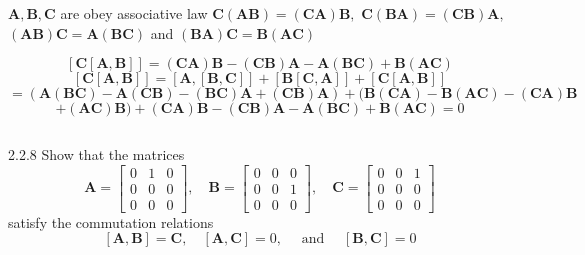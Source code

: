 $\mathbf{A}, \mathbf{B}, \mathbf{C}$ are obey associative law $ \mathbf{C}(\mathbf{A} \mathbf{B})=(\mathbf{C} \mathbf{A}) \mathbf{B},$ $\mathbf{C}(\mathbf{B} \mathbf{A})=(\mathbf{C} \mathbf{B}) \mathbf{A},$ $(\mathbf{A} \mathbf{B}) \mathbf{C}=\mathbf{A}(\mathbf{B} \mathbf{C})$ and $(\mathbf{B} \mathbf{A}) \mathbf{C}=\mathbf{B}(\mathbf{A} \mathbf{C})$


$$[\mathbf{C}[\mathbf{A}, \mathbf{B}]]=(\mathbf{C} \mathbf{A}) \mathbf{B}-(\mathbf{C} \mathbf{B}) \mathbf{A}-\mathbf{A}(\mathbf{B} \mathbf{C})+\mathbf{B}(\mathbf{A} \mathbf{C})$$
$$[\mathbf{C}[\mathbf{A}, \mathbf{B}]]=[\mathbf{A},[\mathbf{B}, \mathbf{C}]]+[\mathbf{B}[\mathbf{C}, \mathbf{A}]]+[\mathbf{C}[\mathbf{A}, \mathbf{B}]] $$
$$=(\mathbf{A}(\mathbf{B} \mathbf{C})-\mathbf{A}(\mathbf{C} \mathbf{B})-(\mathbf{B} \mathbf{C}) \mathbf{A}+(\mathbf{C} \mathbf{B}) \mathbf{A})+(\mathbf{B}(\mathbf{C} \mathbf{A})-\mathbf{B}(\mathbf{A} \mathbf{C})-(\mathbf{C} \mathbf{A}) \mathbf{B} $$
$$+(\mathbf{A} \mathbf{C}) \mathbf{B})+(\mathbf{C} \mathbf{A}) \mathbf{B}-(\mathbf{C} \mathbf{B}) \mathbf{A}-\mathbf{A}(\mathbf{B} \mathbf{C})+\mathbf{B}(\mathbf{A} \mathbf{C})=0$$

$$$$

\begin{mybox}{2.2.8}
Show that the matrices
$$\mathbf{A}=\begin{bmatrix}{0} & {1} & {0} \\ {0} & {0} & {0} \\ {0} & {0} & {0}\end{bmatrix}, \quad \mathbf{B}=\begin{bmatrix}{0} & {0} & {0} \\ {0} & {0} & {1} \\ {0} & {0} & {0}\end{bmatrix}, \quad \mathbf{C}=\begin{bmatrix}{0} & {0} & {1} \\ {0} & {0} & {0} \\ {0} & {0} & {0}\end{bmatrix}$$
satisfy the commutation relations
$$
[\mathbf{A}, \mathbf{B}]=\mathbf{C}, \quad[\mathbf{A}, \mathbf{C}]=0, \quad \text { and } \quad[\mathbf{B}, \mathbf{C}]=0
$$
\end{mybox}


